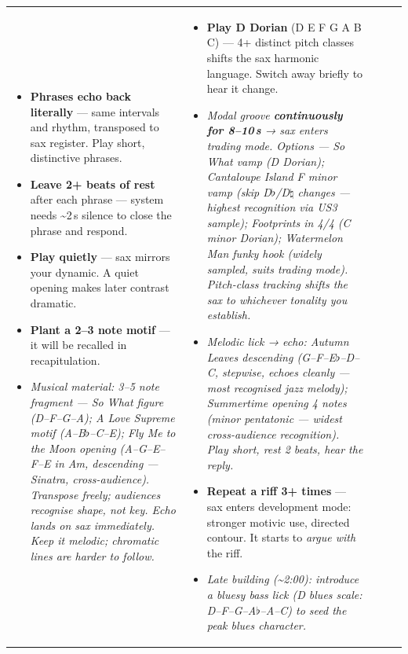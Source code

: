 \documentclass[9pt,a4paper,landscape]{article}
\newcommand{\musicue}[1]{{\small\textcolor{musicnote}{\textit{#1}}}}
\begin{document}
\begin{tabularx}{\linewidth}{@{}|X|X|X|X|X|@{}}
\cellcolor{sparsebg}
\begin{itemize}
  \item \textbf{Phrases echo back literally} — same intervals and rhythm, transposed to sax register. Play short, distinctive phrases.
  \item \textbf{Leave 2+ beats of rest} after each phrase — system needs \textasciitilde2\,s silence to close the phrase and respond.
  \item \textbf{Play quietly} — sax mirrors your dynamic. A quiet opening makes later contrast dramatic.
  \item \textbf{Plant a 2–3 note motif} — it will be recalled in recapitulation.
  \item \musicue{Musical material: 3–5 note fragment — \textit{So What} figure (D–F–G–A); \textit{A Love Supreme} motif (A–B$\flat$–C–E); \textit{Fly Me to the Moon} opening (A–G–E–F–E in Am, descending — Sinatra, cross-audience). Transpose freely; audiences recognise shape, not key. Echo lands on sax immediately. Keep it melodic; chromatic lines are harder to follow.}
\end{itemize}
&
\cellcolor{buildingbg}
\begin{itemize}
  \item \textbf{Play D Dorian} (D E F G A B C) — 4+ distinct pitch classes shifts the sax harmonic language. Switch away briefly to hear it change.
  \item \musicue{Modal groove \textbf{continuously for 8–10\,s} → sax enters trading mode. Options — \textit{So What} vamp (D Dorian); \textit{Cantaloupe Island} F minor vamp (skip D$\flat$/D$\natural$ changes — highest recognition via US3 sample); \textit{Footprints} in 4/4 (C minor Dorian); \textit{Watermelon Man} funky hook (widely sampled, suits trading mode). Pitch-class tracking shifts the sax to whichever tonality you establish.}
  \item \musicue{Melodic lick → echo: \textit{Autumn Leaves} descending (G–F–E$\flat$–D–C, stepwise, echoes cleanly — most recognised jazz melody); \textit{Summertime} opening 4 notes (minor pentatonic — widest cross-audience recognition). Play short, rest 2 beats, hear the reply.}
  \item \textbf{Repeat a riff 3+ times} — sax enters development mode: stronger motivic use, directed contour. It starts to \textit{argue with} the riff.
  \item \musicue{Late building (\textasciitilde2:00): introduce a bluesy bass lick (D blues scale: D–F–G–A$\flat$–A–C) to seed the peak blues character.}

\end{itemize}
\end{tabularx}
\end{document}
